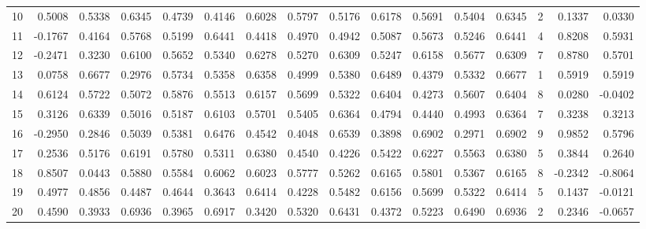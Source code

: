 \begin{tabular}{lrrrrrrrrrrrrrrr}
10  &      0.5008 &  0.5338 &  0.6345 &  0.4739 &  0.4146 &  0.6028 &  0.5797 &  0.5176 &  0.6178 &  0.5691 &   0.5404 &     0.6345 &      2 &                    0.1337 &                     0.0330 \\
11  &     -0.1767 &  0.4164 &  0.5768 &  0.5199 &  0.6441 &  0.4418 &  0.4970 &  0.4942 &  0.5087 &  0.5673 &   0.5246 &     0.6441 &      4 &                    0.8208 &                     0.5931 \\
12  &     -0.2471 &  0.3230 &  0.6100 &  0.5652 &  0.5340 &  0.6278 &  0.5270 &  0.6309 &  0.5247 &  0.6158 &   0.5677 &     0.6309 &      7 &                    0.8780 &                     0.5701 \\
13  &      0.0758 &  0.6677 &  0.2976 &  0.5734 &  0.5358 &  0.6358 &  0.4999 &  0.5380 &  0.6489 &  0.4379 &   0.5332 &     0.6677 &      1 &                    0.5919 &                     0.5919 \\
14  &      0.6124 &  0.5722 &  0.5072 &  0.5876 &  0.5513 &  0.6157 &  0.5699 &  0.5322 &  0.6404 &  0.4273 &   0.5607 &     0.6404 &      8 &                    0.0280 &                    -0.0402 \\
15  &      0.3126 &  0.6339 &  0.5016 &  0.5187 &  0.6103 &  0.5701 &  0.5405 &  0.6364 &  0.4794 &  0.4440 &   0.4993 &     0.6364 &      7 &                    0.3238 &                     0.3213 \\
16  &     -0.2950 &  0.2846 &  0.5039 &  0.5381 &  0.6476 &  0.4542 &  0.4048 &  0.6539 &  0.3898 &  0.6902 &   0.2971 &     0.6902 &      9 &                    0.9852 &                     0.5796 \\
17  &      0.2536 &  0.5176 &  0.6191 &  0.5780 &  0.5311 &  0.6380 &  0.4540 &  0.4226 &  0.5422 &  0.6227 &   0.5563 &     0.6380 &      5 &                    0.3844 &                     0.2640 \\
18  &      0.8507 &  0.0443 &  0.5880 &  0.5584 &  0.6062 &  0.6023 &  0.5777 &  0.5262 &  0.6165 &  0.5801 &   0.5367 &     0.6165 &      8 &                   -0.2342 &                    -0.8064 \\
19  &      0.4977 &  0.4856 &  0.4487 &  0.4644 &  0.3643 &  0.6414 &  0.4228 &  0.5482 &  0.6156 &  0.5699 &   0.5322 &     0.6414 &      5 &                    0.1437 &                    -0.0121 \\
20  &      0.4590 &  0.3933 &  0.6936 &  0.3965 &  0.6917 &  0.3420 &  0.5320 &  0.6431 &  0.4372 &  0.5223 &   0.6490 &     0.6936 &      2 &                    0.2346 &                    -0.0657 \\

\end{tabular}
